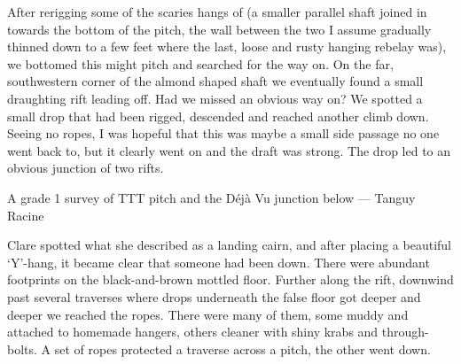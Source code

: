 After rerigging some of the scaries hangs of  (a smaller parallel shaft joined in towards the bottom of the pitch, the wall between the two I assume gradually thinned down to a few feet where the last, loose and rusty hanging rebelay was), we bottomed this might pitch and searched for the way on. On the far, southwestern corner of the almond shaped shaft  we eventually found a small draughting rift leading off. Had we missed an obvious way on? We spotted a small drop that had been rigged, descended and reached another climb down. Seeing no ropes, I was hopeful that this was maybe a small side passage no one went back to, but it clearly went on and the draft was strong. The drop led to an obvious junction of two rifts.

\begin{survey*}[t]
\checkoddpage \ifoddpage \forcerectofloat \else \forceversofloat \fi
\centering
{}
\caption{A grade 1 survey of TTT pitch and the Déjà Vu junction below --- Tanguy Racine}
\label{Grade 1 survey}
\end{survey*}

Clare spotted what she described as a landing cairn, and after placing a beautiful ‘Y’-hang, it became clear that someone had been down. There were abundant footprints on the black-and-brown mottled floor. Further along the rift, downwind past several traverses where drops underneath the false floor got deeper and deeper we reached the ropes. There were many of them, some muddy and attached to homemade hangers, others cleaner with shiny krabs and through-bolts. A set of ropes protected a traverse across a pitch, the other went down.

